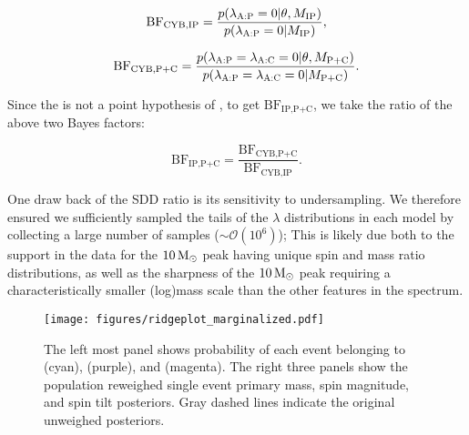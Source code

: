 \begin{equation} \label{eq:BF1}
\text{BF}_{\text{CYB,IP}} = \frac{p(\lambda_\textsc{A:P} = 0 | \theta, M_\text{IP})}{p(\lambda_\textsc{A:P} = 0 | M_\text{IP})},
\end{equation}

\begin{equation}\label{eq:BF2}
  \text{BF}_{\text{CYB,P+C}} = \frac{p(\lambda_\textsc{A:P} = \lambda_\textsc{A:C}= 0 | \theta, M_\text{P+C})}{p(\lambda_\textsc{A:P} = \lambda_\textsc{A:C} = 0 | M_\text{P+C})}.
\end{equation}

Since the \base{} is not a point hypothesis of \comp{}, to get $\text{BF}_\text{IP,P+C}$, we take the ratio of the above two Bayes factors:

\begin{equation}\label{eq:BF1}
  \text{BF}_\text{IP,P+C} = \frac{\text{BF}_{\text{CYB,P+C}}}{\text{BF}_{\text{CYB,IP}}}.
\end{equation}

One draw back of the SDD ratio is its sensitivity to undersampling. We therefore ensured we sufficiently sampled the tails of the $\lambda$ distributions in each model by collecting a large number of samples ($\sim\mathcal{O}(10^6)$);  This is likely due both to the support in the data for the $10{\,\rm M}_\odot$ peak having unique spin and mass ratio distributions, as well as the sharpness of the $10 {\,\rm M}_\odot$ peak requiring a characteristically smaller (log)mass scale than the other features in the spectrum.




\begin{figure*}[]
    \begin{centering}
        \texttt{[image: figures/ridgeplot\_marginalized.pdf]}
        \caption{The left most panel shows probability of each event belonging to \first{} (cyan), \contA{} (purple), and \contB{} (magenta). The right three panels show the population reweighed single event primary mass, spin magnitude, and spin tilt posteriors. Gray dashed lines indicate the original unweighed posteriors.}
        \label{fig:ridgeplot}
    \end{centering}
\end{figure*}



